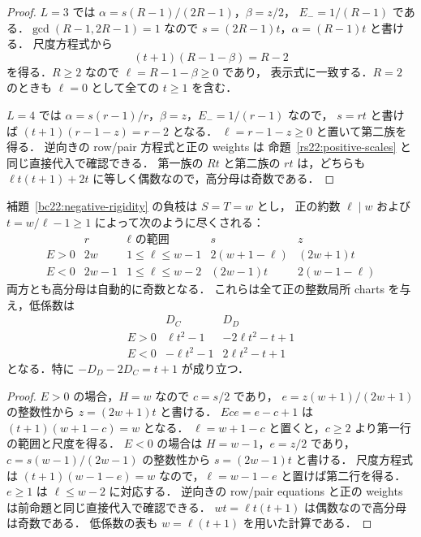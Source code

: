 \begin{proof}
$L=3$ では $\alpha=s(R-1)/(2R-1)$，$\beta=z/2$，
$E_-=1/(R-1)$ である．$\gcd(R-1,2R-1)=1$ なので
$s=(2R-1)t$，$\alpha=(R-1)t$ と書ける．
尺度方程式から
\[
 (t+1)(R-1-\beta)=R-2
\]
を得る．$R\ge2$ なので $\ell=R-1-\beta\ge0$ であり，
表示式に一致する．$R=2$ のときも $\ell=0$ として全ての $t\ge1$ を含む．

$L=4$ では $\alpha=s(r-1)/r$，$\beta=z$，$E_-=1/(r-1)$ なので，
$s=rt$ と書けば $(t+1)(r-1-z)=r-2$ となる．
$\ell=r-1-z\ge0$ と置いて第二族を得る．
逆向きの row/pair 方程式と正の weights は
命題~\ref{rs22:positive-scales} と同じ直接代入で確認できる．
第一族の $Rt$ と第二族の $rt$ は，どちらも
$\ell t(t+1)+2t$ に等しく偶数なので，高分母は奇数である．
\end{proof}

\begin{proposition}[負枝の全尺度]
\label{rs22:negative-scales}
補題~\ref{bc22:negative-rigidity} の負枝は $S=T=w$ とし，
正の約数 $\ell\mid w$ および $t=w/\ell-1\ge1$ によって次のように尽くされる：
\[
 \begin{array}{c|c|c|c|c}
 &r&\ell\text{ の範囲}&s&z\\\hline
 E>0&2w&1\le\ell\le w-1&2(w+1-\ell)&(2w+1)t\\
 E<0&2w-1&1\le\ell\le w-2&(2w-1)t&2(w-1-\ell)
 \end{array}
\]
両方とも高分母は自動的に奇数となる．
これらは全て正の整数局所 charts を与え，低係数は
\[
 \begin{array}{c|cc}
 &D_C&D_D\\\hline
 E>0&\ell t^2-1&-2\ell t^2-t+1\\
 E<0&-\ell t^2-1&2\ell t^2-t+1
 \end{array}
\]
となる．特に $-D_D-2D_C=t+1$ が成り立つ．
\end{proposition}

\begin{proof}
$E>0$ の場合，$H=w$ なので $c=s/2$ であり，
$e=z(w+1)/(2w+1)$ の整数性から $z=(2w+1)t$ と書ける．
$Ece=e-c+1$ は $(t+1)(w+1-c)=w$ となる．
$\ell=w+1-c$ と置くと，$c\ge2$ より第一行の範囲と尺度を得る．
$E<0$ の場合は $H=w-1$，$e=z/2$ であり，
$c=s(w-1)/(2w-1)$ の整数性から $s=(2w-1)t$ と書ける．
尺度方程式は $(t+1)(w-1-e)=w$ なので，$\ell=w-1-e$ と置けば第二行を得る．
$e\ge1$ は $\ell\le w-2$ に対応する．
逆向きの row/pair equations と正の weights は前命題と同じ直接代入で確認できる．
$wt=\ell t(t+1)$ は偶数なので高分母は奇数である．
低係数の表も $w=\ell(t+1)$ を用いた計算である．
\end{proof}

